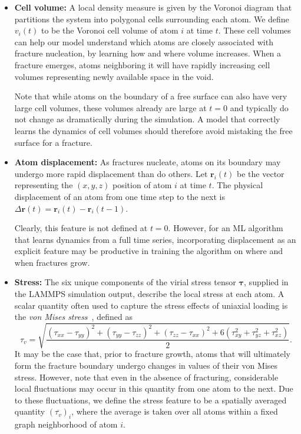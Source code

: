 \begin{itemize}
    
    \item \textbf{Cell volume:} A local density measure is given by the Voronoi diagram that partitions the system into polygonal cells surrounding each atom.  We define $v_i(t)$ to be the Voronoi cell volume of atom $i$ at time $t$.  These cell volumes can help our model understand which atoms are closely associated with fracture nucleation, by learning how and where volume increases.  When a fracture emerges, atoms neighboring it will have rapidly increasing cell volumes representing newly available space in the void.
    
    Note that while atoms on the boundary of a free surface can also have very large cell volumes, these volumes already are large at $t=0$ and typically do not change as dramatically during the simulation.  A model that correctly learns the dynamics of cell volumes should therefore avoid mistaking the free surface for a fracture.

    \item \textbf{Atom displacement:} As fractures nucleate, atoms on its boundary may undergo more rapid displacement than do others.  Let $\mathbf{r}_i(t)$ be the vector representing the $(x,y,z)$ position of atom $i$ at time $t$. The physical displacement of an atom from one time step to the next is $\Delta \mathbf{r}(t)=\mathbf{r}_i(t)-\mathbf{r}_i(t-1)$.
    
    Clearly, this feature is not defined at $t=0$.  However, for an ML algorithm that learns dynamics from a full time series, incorporating displacement as an explicit feature may be productive in training the algorithm on where and when fractures grow.

    \item\textbf{Stress:} The six unique components of the virial stress tensor $\boldsymbol{\tau}$, supplied in the LAMMPS simulation output, describe the local stress at each atom.  A scalar quantity often used to capture the stress effects of uniaxial loading is the \emph{von Mises stress}~\cite{elastic_fracture}, defined as
    \begin{equation}
    \tau_v = \sqrt{\frac{(\tau_{xx}-\tau_{yy})^2+(\tau_{yy}-\tau_{zz})^2+(\tau_{zz}-\tau_{xx})^2 + 6 (\tau_{xy}^2+\tau_{yz}^2+\tau_{xz}^2)}{2}}.
    \end{equation}
    It may be the case that, prior to fracture growth, atoms that will ultimately form the fracture boundary undergo changes in values of their von Mises stress. However, note that even in the absence of fracturing, considerable local fluctuations may occur in this quantity from one atom to the next.  Due to these fluctuations, we define the stress feature to be a spatially averaged quantity $(\overline{\tau_v})_i$, where the average is taken over all atoms within a fixed graph neighborhood of atom $i$.


\end{itemize}
